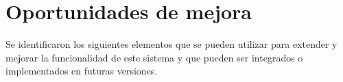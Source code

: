 
    \section {Oportunidades de mejora}


Se identificaron los siguientes elementos que se pueden utilizar para extender y mejorar la funcionalidad de este sistema y que pueden ser integrados o implementados en futuras versiones.

